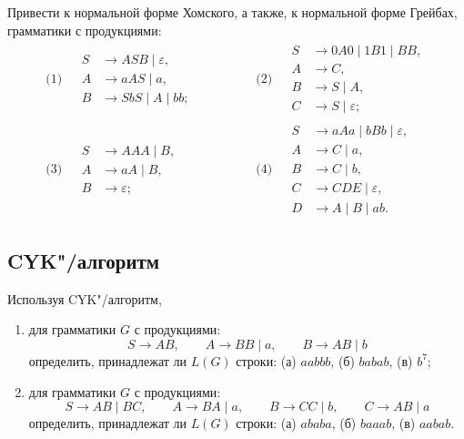 Привести к нормальной форме Хомского, а также, к нормальной форме Грей\-бах, грамматики с продукциями:
\begin{align*}
    \text{(1) }&
        \begin{aligned}%
            S &\to ASB \mid \varepsilon,\\
            A &\to aAS \mid a,\\
            B &\to SbS \mid A \mid bb;
        \end{aligned}
        \qquad\qquad{}
    &
    \text{(2) }&
        \begin{aligned}%
            S &\to 0A0 \mid 1B1 \mid BB,\\
            A &\to C,\\
            B &\to S \mid A,\\
            C &\to S \mid \varepsilon;
        \end{aligned}
    \\[.3cm]
    \text{(3) }&
        \begin{aligned}%
            S &\to AAA \mid B,\\
            A &\to aA \mid B,\\
            B &\to \varepsilon;
        \end{aligned}
        \qquad\qquad{}
    &
    \text{(4) }&
        \begin{aligned}%
            S &\to aAa \mid bBb \mid \varepsilon,\\
            A &\to C \mid a,\\
            B &\to C \mid b,\\
            C &\to CDE \mid \varepsilon,\\
            D &\to A \mid B \mid ab.
        \end{aligned}
\end{align*}

\subsection*{CYK"/алгоритм}

Используя CYK"/алгоритм,
\begin{enumerate}
    \item
    для грамматики $G$ с продукциями:
    \[
        S \to AB, \qquad
        A \to BB \mid a, \qquad
        B \to AB \mid b
    \]
    определить, принадлежат ли $L(G)$ строки: (а) $aabbb$, (б) $babab$,
    (в) $b^7$;

    \item
    для грамматики $G$ с продукциями:
    \[
        S \to AB \mid BC,\qquad
        A \to BA \mid a,\qquad
        B \to CC \mid b,\qquad
        C \to AB \mid a
    \]
    определить, принадлежат ли $L(G)$ строки: (а) $ababa$, (б) $baaab$, (в) $aabab$.
\end{enumerate}
